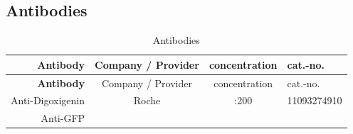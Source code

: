 \documentclass[11pt,singlespacinge,twoside]{reedthesis} %
\theoremstyle{definition}
\theoremstyle{definition}
\theoremstyle{definition}
\theoremstyle{remark}
\begin{document}
\hypertarget{mat-anitb}{%
\subsection{Antibodies}\label{mat-anitb}}
\begin{longtable}[]{@{}rccl@{}}
\caption{\label{tab:mat-antib} Antibodies}\tabularnewline
\toprule
\begin{minipage}[b]{0.21\columnwidth}\raggedleft
\textbf{Antibody}\strut
\end{minipage} & \begin{minipage}[b]{0.34\columnwidth}\centering
Company / Provider\strut
\end{minipage} & \begin{minipage}[b]{0.19\columnwidth}\centering
concentration\strut
\end{minipage} & \begin{minipage}[b]{0.15\columnwidth}\raggedright
cat.-no.\strut
\end{minipage}\tabularnewline
\midrule
\endfirsthead
\toprule
\begin{minipage}[b]{0.21\columnwidth}\raggedleft
\textbf{Antibody}\strut
\end{minipage} & \begin{minipage}[b]{0.34\columnwidth}\centering
Company / Provider\strut
\end{minipage} & \begin{minipage}[b]{0.19\columnwidth}\centering
concentration\strut
\end{minipage} & \begin{minipage}[b]{0.15\columnwidth}\raggedright
cat.-no.\strut
\end{minipage}\tabularnewline
\midrule
\endhead
\begin{minipage}[t]{0.21\columnwidth}\raggedleft
Anti-Digoxigenin\strut
\end{minipage} & \begin{minipage}[t]{0.34\columnwidth}\centering
Roche\strut
\end{minipage} & \begin{minipage}[t]{0.19\columnwidth}\centering
1:200\strut
\end{minipage} & \begin{minipage}[t]{0.15\columnwidth}\raggedright
11093274910\strut
\end{minipage}\tabularnewline
\begin{minipage}[t]{0.21\columnwidth}\raggedleft
Anti-GFP\strut
\end{minipage} & \begin{minipage}[t]{0.34\columnwidth}\centering

\end{minipage}
\end{longtable}
\end{document}
